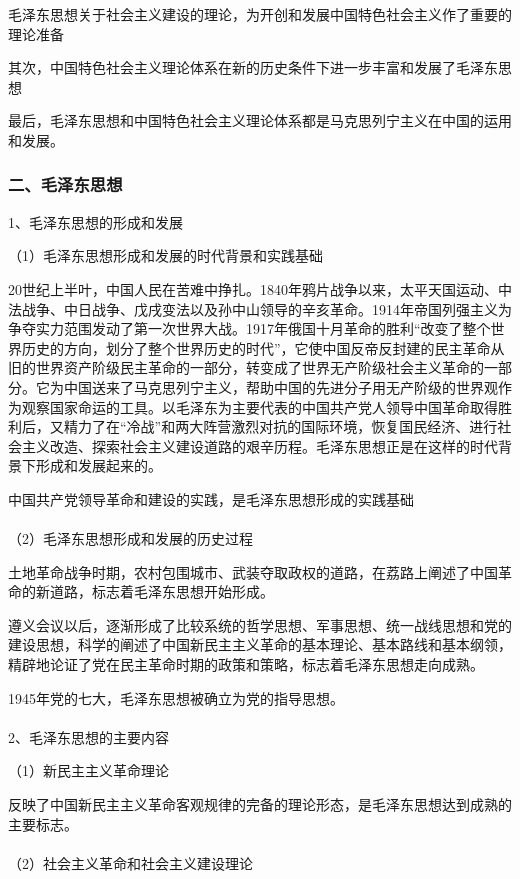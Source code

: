 \documentclass{ctexart}
\begin{document}
毛泽东思想关于社会主义建设的理论，为开创和发展中国特色社会主义作了重要的理论准备

其次，中国特色社会主义理论体系在新的历史条件下进一步丰富和发展了毛泽东思想

最后，毛泽东思想和中国特色社会主义理论体系都是马克思列宁主义在中国的运用和发展。

\subsubsection{二、毛泽东思想}
1、毛泽东思想的形成和发展

（1）毛泽东思想形成和发展的时代背景和实践基础

20世纪上半叶，中国人民在苦难中挣扎。1840年鸦片战争以来，太平天国运动、中法战争、中日战争、戊戌变法以及孙中山领导的辛亥革命。1914年帝国列强主义为争夺实力范围发动了第一次世界大战。1917年俄国十月革命的胜利“改变了整个世界历史的方向，划分了整个世界历史的时代”，它使中国反帝反封建的民主革命从旧的世界资产阶级民主革命的一部分，转变成了世界无产阶级社会主义革命的一部分。它为中国送来了马克思列宁主义，帮助中国的先进分子用无产阶级的世界观作为观察国家命运的工具。以毛泽东为主要代表的中国共产党人领导中国革命取得胜利后，又精力了在“冷战”和两大阵营激烈对抗的国际环境，恢复国民经济、进行社会主义改造、探索社会主义建设道路的艰辛历程。毛泽东思想正是在这样的时代背景下形成和发展起来的。

中国共产党领导革命和建设的实践，是毛泽东思想形成的实践基础
\\\\

（2）毛泽东思想形成和发展的历史过程

土地革命战争时期，农村包围城市、武装夺取政权的道路，在荔路上阐述了中国革命的新道路，标志着毛泽东思想开始形成。

遵义会议以后，逐渐形成了比较系统的哲学思想、军事思想、统一战线思想和党的建设思想，科学的阐述了中国新民主主义革命的基本理论、基本路线和基本纲领，精辟地论证了党在民主革命时期的政策和策略，标志着毛泽东思想走向成熟。

1945年党的七大，毛泽东思想被确立为党的指导思想。
\\\\

2、毛泽东思想的主要内容

（1）新民主主义革命理论

反映了中国新民主主义革命客观规律的完备的理论形态，是毛泽东思想达到成熟的主要标志。
\\\\

（2）社会主义革命和社会主义建设理论
\\\\
\end{document}

